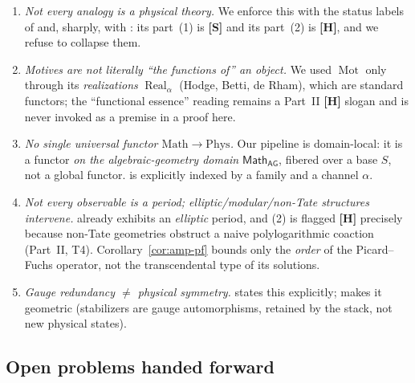 \documentclass[12pt]{article}
\theoremstyle{definition}
\theoremstyle{remark}
\newcommand{\Mot}{\operatorname{Mot}}
\newcommand{\Real}{\operatorname{Real}}
\newcommand{\Math}{\mathsf{Math}}
\newcommand{\status}[1]{\textnormal{\textsf{\textbf{[#1]}}}}
\begin{document}
\begin{enumerate}
  \item \emph{Not every analogy is a physical theory.} We enforce this with the status labels of
   and, sharply, with : its part~(1) is \status{S} and its
  part~(2) is \status{H}, and we refuse to collapse them.
  \item \emph{Motives are not literally ``the functions of'' an object.} We used $\Mot$ only through its
  \emph{realizations} $\Real_\alpha$ (Hodge, Betti, de Rham), which are standard functors; the
  ``functional essence'' reading remains a Part~II \status{H} slogan and is never invoked as a premise in
  a proof here.
  \item \emph{No single universal functor $\mathrm{Math}\to\mathrm{Phys}$.} Our pipeline is
  domain-local: it is a functor \emph{on the algebraic-geometry domain} $\Math_{\mathsf{AG}}$, fibered
  over a base $S$, not a global functor.  is explicitly indexed by a family and
  a channel $\alpha$.
  \item \emph{Not every observable is a period; elliptic/modular/non-Tate structures intervene.}
   already exhibits an \emph{elliptic} period, and (2) is flagged
  \status{H} precisely because non-Tate geometries obstruct a naive polylogarithmic coaction (Part~II,
  T4). Corollary~\ref{cor:amp-pf} bounds only the \emph{order} of the Picard--Fuchs operator, not the
  transcendental type of its solutions.
  \item \emph{Gauge redundancy $\neq$ physical symmetry.}  states this
  explicitly;  makes it geometric (stabilizers are gauge automorphisms, retained by the
  stack, not new physical states).
\end{enumerate}

\subsection{Open problems handed forward}
\label{sec:open}
\end{document}

